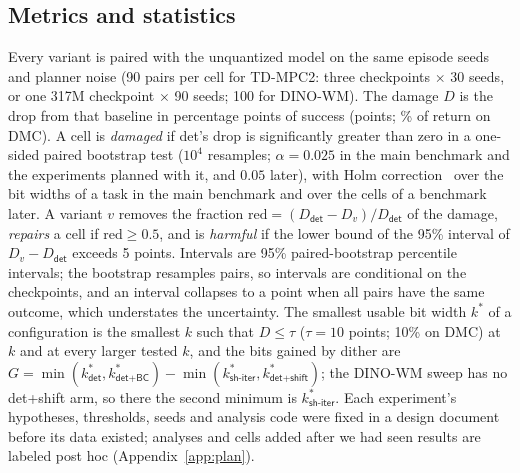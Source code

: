 \documentclass[10pt]{article}
\newcommand{\dtm}{\textsf{det}\xspace}
\newcommand{\detbc}{\textsf{det+BC}\xspace}
\newcommand{\shiter}{\textsf{sh-iter}\xspace}
\newcommand{\detshift}{\textsf{det+shift}\xspace}
\newcommand{\red}{\mathrm{red}}
\begin{document}
\subsection{Metrics and statistics}
\label{sec:stats}
Every variant is paired with the unquantized model on the same episode seeds and planner noise (90 pairs per cell for TD-MPC2: three checkpoints $\times$ 30 seeds, or one 317M checkpoint $\times$ 90 seeds; 100 for DINO-WM). The damage $D$ is the drop from that baseline in percentage points of success (points; \% of return on DMC). A cell is \emph{damaged} if \dtm's drop is significantly greater than zero in a one-sided paired bootstrap test ($10^4$ resamples; $\alpha=0.025$ in the main benchmark and the experiments planned with it, and $0.05$ later), with Holm correction~\citep{holm1979} over the bit widths of a task in the main benchmark and over the cells of a benchmark later. A variant $v$ removes the fraction $\red=(D_{\dtm}-D_v)/D_{\dtm}$ of the damage, \emph{repairs} a cell if $\red\ge0.5$, and is \emph{harmful} if the lower bound of the 95\% interval of $D_v-D_{\dtm}$ exceeds 5 points. Intervals are 95\% paired-bootstrap percentile intervals; the bootstrap resamples pairs, so intervals are conditional on the checkpoints, and an interval collapses to a point when all pairs have the same outcome, which understates the uncertainty. The smallest usable bit width $k^*$ of a configuration is the smallest $k$ such that $D\le\tau$ ($\tau=10$ points; 10\% on DMC) at $k$ and at every larger tested $k$, and the bits gained by dither are $G=\min(k^*_{\dtm},k^*_{\detbc})-\min(k^*_{\shiter},k^*_{\detshift})$; the DINO-WM sweep has no \detshift arm, so there the second minimum is $k^*_{\shiter}$. Each experiment's hypotheses, thresholds, seeds and analysis code were fixed in a design document before its data existed; analyses and cells added after we had seen results are labeled post hoc (Appendix~\ref{app:plan}).
\end{document}
